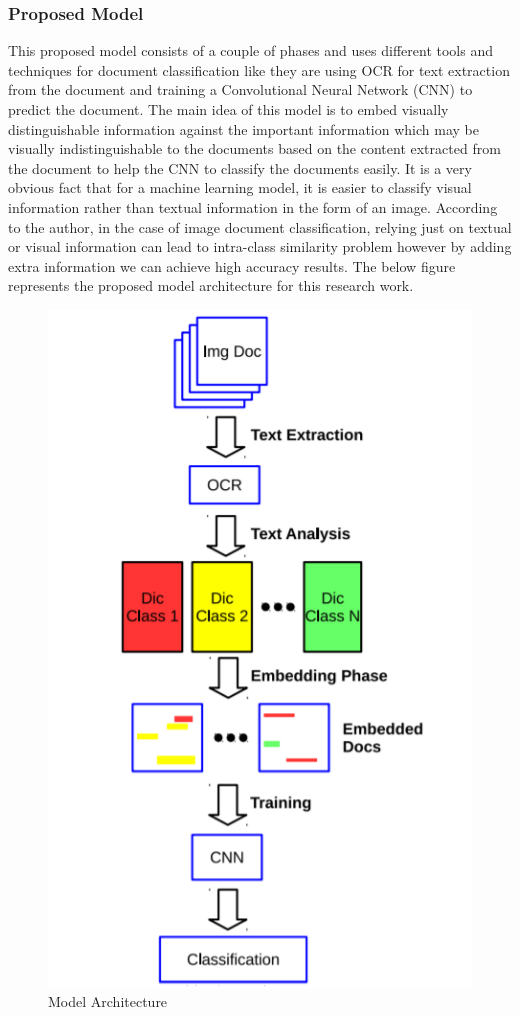\subsubsection{Proposed Model}
This proposed model consists of a couple of phases and uses different tools and techniques for document classification like they are using OCR for text extraction from the document and training a Convolutional Neural Network (CNN) to predict the document. The main idea of this model is to embed visually distinguishable information against the important information which may be visually indistinguishable to the documents based on the content extracted from the document to help the CNN to classify the documents easily. It is a very obvious fact that for a machine learning model, it is easier to classify visual information rather than textual information in the form of an image. According to the author, in the case of image document classification, relying just on textual or visual information can lead to intra-class similarity problem however by adding extra information we can achieve high accuracy results. The below figure represents the proposed model architecture for this research work.
\begin{figure}[H]
\centering
\includegraphics[scale=0.9]{images/Chapter1/RW2.PNG}
\caption{Model Architecture \cite{Noce2016DocumentIC}}
\label{rw2-model-arch}
\end{figure}

